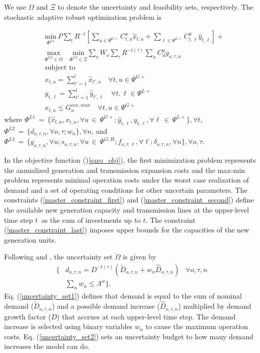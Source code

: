 \documentclass[final]{IEEEtran}
\newcommand{\myin}{\,{\in}\,}
\newcommand{\myeq}{\,{=}\,}
\begin{document}
We use $\Omega$ and $\Xi$ to denote the uncertainty and feasibility sets, respectively. The stochastic adaptive robust optimization problem is

\begin{align}
&\underset{\Phi^{L1}}{\text{min}} \, P \sum\limits_{t} R^{-t} \left[ \sum\limits_{u \in \Psi^{G+}} C^x_{t, u} \hat{x}_{t, u} + \sum\limits_{\ell \in \Psi^{L+}} C^y_{t, \ell} \hat{y}_{t, \ell} \right] + \nonumber \\
&\label{saro_obj}\underset{\Phi^{L2} \in \Omega}{\text{max}} \quad \underset{\Phi^{L3} \in \Xi}{\text{min}} \sum\limits_o W_o \sum\limits_{\tau} R^{-t(\tau)} \sum\limits_{u} C^g_{u} g_{o, \tau, u} \\
&\text{subject to} \nonumber \\
&\label{master_constraint_first} x_{t, u} = \sum\limits_{t' = 1}^{t} \hat{x}_{t', u} 	\quad \forall t, u \in \Psi^{G+} \\
&\label{master_constraint_second} y_{t, \ell} = \sum\limits_{t' = 1}^{t} \hat{y}_{t', \ell} 	\quad \forall t, \ell \in \Psi^{L+} \\
&\label{master_constraint_last} x_{t, u} \leq G^{inv, max}_u \quad \forall t, u \in \Psi^{G+}
\end{align}
where \( \Phi^{L1} \myeq \{ \hat{x}_{t, u}, x_{t, u}, \forall u \myin \Psi^{G+}; \hat{y}_{t, \ell}, y_{t, \ell}, \forall \ell \myin \Psi^{L+} \}, \forall t \), \( \Phi^{L2} \myeq \{ d_{o, \tau, n}, \forall o, \tau; w_{n} \}, \forall n \), and \( \Phi^{L3} \myeq \{ g_{o, \tau, u}, \forall u; s_{o, \tau, u}, \forall u \myin \Psi^{G, H}; f_{o, \tau, \ell}, \forall \ell; \delta_{o, \tau, n}, \forall n \}, \forall o, \tau \).

In the objective function ()\ref{saro_obj}), the first minimization problem represents the annualized generation and transmission expansion costs and the max-min problem represents minimal operation costs under the worst case realization of demand and a set of operating conditions for other uncertain parameters. The constraints (\ref{master_constraint_first}) and (\ref{master_constraint_second}) define the available new generation capacity and transmission lines at the upper-level time step $t$ as the sum of investments up to $t$. The constraint (\ref{master_constraint_last}) imposes upper bounds for the capacities of the new generation units.

Following \cite{Minguez} and \cite{Baringo2018}, the uncertainty set $\Omega$ is given by
\begin{align}
\label{uncertainty_set1}\{ &d_{o, \tau, n} = D^{-t(\tau)} (\tilde{D}_{o, \tau, n} + w_n \hat{D}_{o, \tau, n}) & \forall o, \tau, n \\
&\label{uncertainty_set2}\sum\limits_n w_{n} \leq \Lambda^w \}.
\end{align}
Eq. (\ref{uncertainty_set1}) defines that demand is equal to the sum of nominal demand ($\tilde{D}_{o, \tau, n}$) and a possible demand increase ($\hat{D}_{o, \tau, n}$) multiplied by demand growth factor ($D$) that accrues at each upper-level time step. The demand increase is selected using binary variables $w_n$ to cause the maximum operation costs. Eq. (\ref{uncertainty_set2}) sets an uncertainty budget to how many demand increases the model can do.
\end{document}
